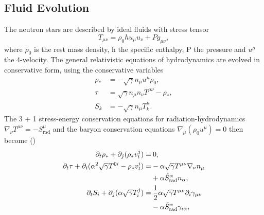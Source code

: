 
\subsection{Fluid Evolution}

The neutron stars are described by ideal fluids with stress tensor
\begin{equation}
T_{\mu\nu} = \rho_0 h u_\mu u_\nu + Pg_{\mu\nu},
\end{equation}
%
where $\rho_0$ is the rest mass density, h the specific enthalpy, P the pressure and $u^\mu$ the 4-velocity. The general relativistic equations of hydrodynamics are evolved in conservative form, using the conservative variables
%
\begin{align}
  \rho_* &= -\sqrt{\gamma}n_\mu u^\mu \rho_0, \\
  \tau &= \sqrt{\gamma}n_\mu n_\nu T^{\mu\nu} - \rho_*, \\
  S_k &= -\sqrt{\gamma}n_\mu T^\mu_k.
\end{align}
%
The 3 + 1 stress-energy conservation equations for radiation-hydrodynamics $\nabla_\nu T^{\mu\nu} = -S^\mu_\text{rad}$ and the baryon conservation equations $\nabla_\mu (\rho_0 u^\mu) = 0$ then become (\citet*{shibata2011truncated})
%
%
\begin{align}
  \partial_t \rho_* + \partial_j(\rho_* v_t^j) =&\:0, \\
  \partial_t \tau + \partial_i (\alpha^2 \sqrt{\gamma} T^{0i} - \rho_* v_t^i) =& -\alpha \sqrt{\gamma} T^{\mu\nu} \nabla_\nu n_\mu\\
  &+ \alpha \tilde S_\text{rad}^\alpha n_\alpha, \notag\\
  \partial_t S_i + \partial_j(\alpha\sqrt{\gamma}T^j_i) =&\: \frac{1}{2}\alpha \sqrt{\gamma} T^{\mu\nu} \partial_i \gamma_{\mu\nu} \\
  &- \alpha \tilde S_\text{rad}^\alpha \gamma_{i\alpha},\notag
\end{align}

